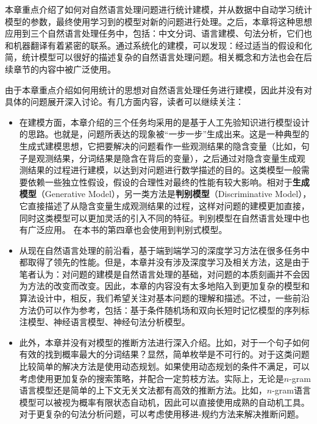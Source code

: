 \parinterval 本章重点介绍了如何对自然语言处理问题进行统计建模，并从数据中自动学习统计模型的参数，最终使用学习到的模型对新的问题进行处理。之后，本章将这种思想应用到三个自然语言处理任务中，包括：中文分词、语言建模、句法分析，它们也和机器翻译有着紧密的联系。通过系统化的建模，可以发现：经过适当的假设和化简，统计模型可以很好的描述复杂的自然语言处理问题。相关概念和方法也会在后续章节的内容中被广泛使用。

\parinterval 由于本章重点介绍如何用统计的思想对自然语言处理任务进行建模，因此并没有对具体的问题展开深入讨论。有几方面内容，读者可以继续关注：

\begin{adjustwidth}{1em}{}
\begin{itemize}
\vspace{0.5em}
\item 在建模方面，本章介绍的三个任务均采用的是基于人工先验知识进行模型设计的思路。也就是，问题所表达的现象被``一步一步''生成出来。这是一种典型的生成式建模思想，它把要解决的问题看作一些观测结果的隐含变量（比如，句子是观测结果，分词结果是隐含在背后的变量），之后通过对隐含变量生成观测结果的过程进行建模，以达到对问题进行数学描述的目的。这类模型一般需要依赖一些独立性假设，假设的合理性对最终的性能有较大影响。相对于{\small\sffamily\bfseries{生成模型}}（Generative Model），另一类方法是{\small\sffamily\bfseries{判别模型}}（Discriminative Model），它直接描述了从隐含变量生成观测结果的过程，这样对问题的建模更加直接，同时这类模型可以更加灵活的引入不同的特征。判别模型在自然语言处理中也有广泛应用\cite{shannon1948mathematical}\cite{ng2002discriminative}。 在本书的第四章也会使用到判别式模型。
\vspace{0.5em}
\item 从现在自然语言处理的前沿看，基于端到端学习的深度学习方法在很多任务中都取得了领先的性能。但是，本章并没有涉及深度学习及相关方法，这是由于笔者认为：对问题的建模是自然语言处理的基础，对问题的本质刻画并不会因为方法的改变而改变。因此，本章的内容没有太多地陷入到更加复杂的模型和算法设计中，相反，我们希望关注对基本问题的理解和描述。不过，一些前沿方法仍可以作为参考，包括：基于条件随机场和双向长短时记忆模型的序列标注模型\cite{lafferty2001conditional}\cite{huang2015bidirectional}\cite{ma2016end}、神经语言模型\cite{bengio2003neural}\cite{mikolov2010recurrent}、神经句法分析模型\cite{chen2014fast}\cite{zhu2015long}。
\vspace{0.5em}
\item 此外，本章并没有对模型的推断方法进行深入介绍。比如，对于一个句子如何有效的找到概率最大的分词结果？显然，简单枚举是不可行的。对于这类问题比较简单的解决方法是使用动态规划\cite{huang2008advanced}。如果使用动态规划的条件不满足，可以考虑使用更加复杂的搜索策略，并配合一定剪枝方法。实际上，无论是$n$-gram语言模型还是简单的上下文无关文法都有高效的推断方法。比如，$n$-gram语言模型可以被视为概率有限状态自动机，因此可以直接使用成熟的自动机工具。对于更复杂的句法分析问题，可以考虑使用移进-规约方法来解决推断问题\cite{aho1972theory}。
\vspace{0.5em}
\end{itemize}
\end{adjustwidth}
